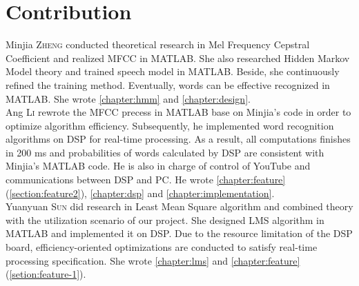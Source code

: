 \chapter*{Contribution}

Minjia \textsc{Zheng} conducted theoretical research in Mel Frequency Cepstral Coefficient and realized MFCC in MATLAB. She also researched Hidden Markov Model theory and trained speech model in MATLAB. Beside, she continuously refined the training method. Eventually, words can be effective recognized in MATLAB. She wrote \autoref{chapter:hmm} and \autoref{chapter:design}.\\

Ang \textsc{Li} rewrote the MFCC precess in MATLAB base on Minjia's code in order to optimize algorithm efficiency. Subsequently, he implemented word recognition algorithms on DSP for real-time processing. As a result, all computations finishes in 200 ms and probabilities of words calculated by DSP are consistent with Minjia's MATLAB code. He is also in charge of control of YouTube and communications between DSP and PC. He wrote \autoref{chapter:feature} (\autoref{section:feature2}), \autoref{chapter:dsp} and \autoref{chapter:implementation}.\\

Yuanyuan \textsc{Sun} did research in Least Mean Square algorithm and combined theory with the utilization scenario of our project. She designed LMS algorithm in MATLAB and implemented it on DSP. Due to the resource limitation of the DSP board, efficiency-oriented optimizations are conducted to satisfy real-time processing specification. She wrote \autoref{chapter:lms} and \autoref{chapter:feature} (\autoref{setion:feature-1}).
